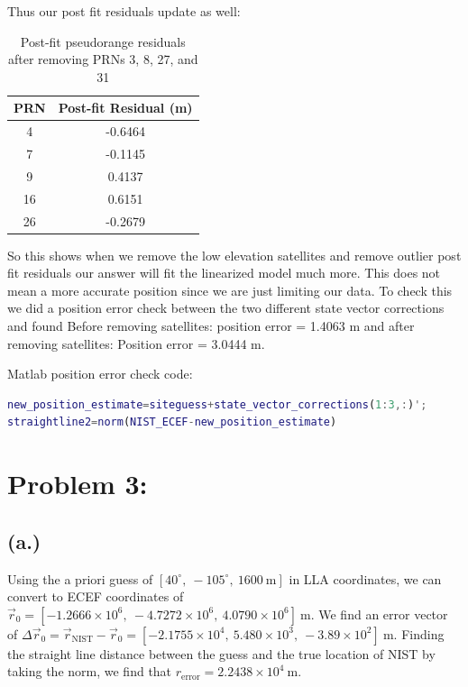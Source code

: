\documentclass[11pt]{article}
\begin{document}
\hspace*{2em}Thus our post fit residuals update as well:
\begin{table}[h!]
    \centering
    \begin{tabular}{|c|c|}
        \hline
        \textbf{PRN} & \textbf{Post-fit Residual (m)} \\ \hline
        4  & -0.6464 \\ \hline
        7  & -0.1145 \\ \hline
        9  &  0.4137 \\ \hline
        16 &  0.6151 \\ \hline
        26 & -0.2679 \\ \hline
    \end{tabular}
    \caption{Post-fit pseudorange residuals after removing PRNs 3, 8, 27, and 31}
    \label{tab:postfit_residuals}
\end{table}

\hspace*{2em}So this shows when we remove the low elevation satellites and remove outlier post fit residuals our answer will fit the linearized model much more. This does not mean a more accurate position since we are just limiting our data. To check this we did a position error check between the two different state vector corrections and found Before removing satellites: position error = 
1.4063 m and after removing satellites: Position error = 3.0444 m.

Matlab position error check code:

\begin{lstlisting}[language=Matlab]
new_position_estimate=siteguess+state_vector_corrections(1:3,:)';
straightline2=norm(NIST_ECEF-new_position_estimate)
\end{lstlisting}
\newpage
\section*{Problem 3:}
\subsection*{(a.)}
\hspace*{2em}Using the a priori guess of $[40^\circ,\ -105^\circ,\ 1600~\mathrm{m}]$ in LLA coordinates, we can convert to ECEF coordinates of $\vec{r}_0 = [-1.2666\times10^{6},\ -4.7272\times10^{6},\ 4.0790\times10^{6}]~\mathrm{m}$. We find an error vector of $\Delta\vec{r}_0 = \vec{r}_{\mathrm{NIST}} - \vec{r}_0 = \boxed{[-2.1755\times10^{4},\ 5.480\times10^{3},\ -3.89\times10^{2}]~\mathrm{m}}$. Finding the straight line distance between the guess and the true location of NIST by taking the norm, we find that $\boxed{r_{\mathrm{error}} = 2.2438\times10^{4}~\mathrm{m}}$.
\end{document}
